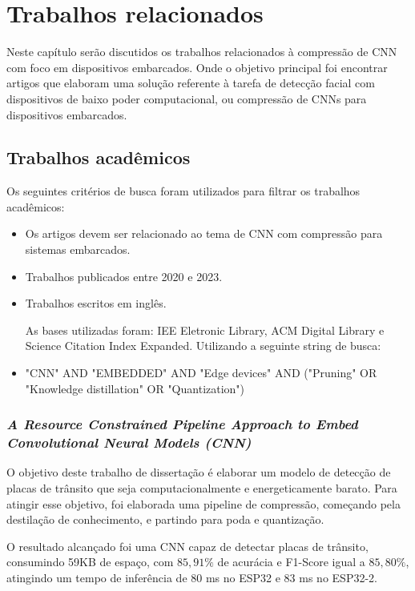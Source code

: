 \chapter{Trabalhos relacionados}\label{cap_trabalhos_relacionados}

Neste capítulo serão discutidos os trabalhos relacionados à compressão de CNN com foco em dispositivos embarcados.
Onde o objetivo principal foi encontrar artigos que elaboram uma solução referente à tarefa de detecção facial com
dispositivos de baixo poder computacional, ou compressão de CNNs para dispositivos embarcados.

\section{Trabalhos acadêmicos}

Os seguintes critérios de busca foram utilizados para filtrar os trabalhos acadêmicos:

\begin{itemize}
	\item Os artigos devem ser relacionado ao tema de CNN com compressão para sistemas embarcados.
	\item Trabalhos publicados entre 2020 e 2023.
	\item Trabalhos escritos em inglês.

	As bases utilizadas foram: IEE Eletronic Library, ACM Digital Library e Science Citation Index Expanded.
	Utilizando a seguinte string de busca:
	\item "CNN"  AND "EMBEDDED" AND "Edge devices" AND ("Pruning" OR "Knowledge distillation" OR "Quantization")
\end{itemize}

\subsection{\textit{A Resource Constrained Pipeline Approach to Embed Convolutional Neural Models (CNN)}}
O objetivo deste trabalho de dissertação \cite{rafael} é elaborar um modelo de detecção de placas de trânsito que seja
computacionalmente e energeticamente barato. Para atingir esse objetivo, foi elaborada uma pipeline de compressão,
começando pela destilação de conhecimento, e partindo para poda e quantização.

O resultado alcançado foi uma CNN capaz de detectar placas de trânsito, consumindo 59KB de espaço, com $85,91\%$ de
acurácia e F1-Score igual a $85,80\%$, atingindo um tempo de inferência de 80 ms no ESP32 e 83 ms no ESP32-2.


